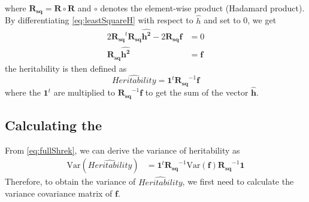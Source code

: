 \documentclass[12pt]{scrbook}
\newcommand*{\Glng}{\Glsentrylong}
\begin{document}
where $\boldsymbol{R_{sq}} = \boldsymbol{R}\circ\boldsymbol{R}$ and $\circ$ denotes the element-wise product (Hadamard product).
By differentiating \cref{eq:leastSquareH} with respect to $\hat{h}$ and set to 0, we get
\begin{align}
2\boldsymbol{R_{sq}}^t\boldsymbol{R_{sq}}\boldsymbol{\hat{h^2}}-2\boldsymbol{R_{sq}f}&=0 \nonumber\\
\boldsymbol{R_{sq}}\boldsymbol{\hat{h^2}} &=\boldsymbol{f}
\label{eq:shrekEq}
\end{align}
the heritability is then defined as 
\begin{equation}
\hat{Heritability} = \boldsymbol{1}^t\boldsymbol{R_{sq}}^{-1}\boldsymbol{f}
\label{eq:fullShrek}
\end{equation}
where the $\boldsymbol{1}^t$ are multiplied to $\boldsymbol{R_{sq}}^{-1}\boldsymbol{f}$ to get the sum of the vector $\hat{\boldsymbol{h}}$.

\subsection{Calculating the \Glng{se}}
From \cref{eq:fullShrek}, we can derive the variance of heritability as 
\begin{align}
\mathrm{Var}(\hat{Heritability})
&=\boldsymbol{1}^t\boldsymbol{R_{sq}}^{-1}\mathrm{Var}(\boldsymbol{f})\boldsymbol{R_{sq}}^{-1}\boldsymbol{1}
\label{eq:varHvarf}
\end{align}
Therefore, to obtain the variance of $\hat{Heritability}$, we first need to calculate the variance covariance matrix of $\boldsymbol{f}$.
\end{document}
